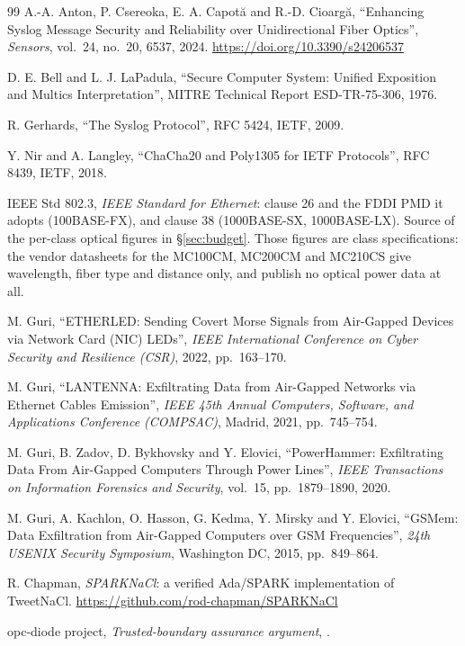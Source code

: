 \documentclass[11pt,a4paper]{article}
\begin{document}
\begin{thebibliography}{99}
\small
{}
A.-A. Anton, P. Csereoka, E. A. Capot\u{a} and R.-D. Cioarg\u{a},
``Enhancing Syslog Message Security and Reliability over Unidirectional Fiber
Optics'', \emph{Sensors}, vol.~24, no.~20, 6537, 2024.
\url{https://doi.org/10.3390/s24206537}

D. E. Bell and L. J. LaPadula,
``Secure Computer System: Unified Exposition and Multics Interpretation'',
MITRE Technical Report ESD-TR-75-306, 1976.

R. Gerhards, ``The Syslog Protocol'', RFC 5424, IETF, 2009.

Y. Nir and A. Langley, ``ChaCha20 and Poly1305 for IETF Protocols'',
RFC 8439, IETF, 2018.

IEEE Std 802.3, \emph{IEEE Standard for Ethernet}: clause 26 and the FDDI PMD
it adopts (100BASE-FX), and clause 38 (1000BASE-SX, 1000BASE-LX). Source of
the per-class optical figures in \S\ref{sec:budget}. Those figures are class
specifications: the vendor datasheets for the MC100CM, MC200CM and MC210CS
give wavelength, fiber type and distance only, and publish no optical power
data at all.

M. Guri, ``ETHERLED: Sending Covert Morse Signals from Air-Gapped Devices via
Network Card (NIC) LEDs'', \emph{IEEE International Conference on Cyber
Security and Resilience (CSR)}, 2022, pp.~163--170.

M. Guri, ``LANTENNA: Exfiltrating Data from Air-Gapped Networks via Ethernet
Cables Emission'', \emph{IEEE 45th Annual Computers, Software, and
Applications Conference (COMPSAC)}, Madrid, 2021, pp.~745--754.

M. Guri, B. Zadov, D. Bykhovsky and Y. Elovici, ``PowerHammer: Exfiltrating
Data From Air-Gapped Computers Through Power Lines'', \emph{IEEE Transactions
on Information Forensics and Security}, vol.~15, pp.~1879--1890, 2020.

M. Guri, A. Kachlon, O. Hasson, G. Kedma, Y. Mirsky and Y. Elovici,
``GSMem: Data Exfiltration from Air-Gapped Computers over GSM Frequencies'',
\emph{24th USENIX Security Symposium}, Washington DC, 2015, pp.~849--864.

R. Chapman, \emph{SPARKNaCl}: a verified Ada/SPARK implementation of TweetNaCl.
\url{https://github.com/rod-chapman/SPARKNaCl}

opc-diode project, \emph{Trusted-boundary assurance argument},
.
\end{thebibliography}
\end{document}
